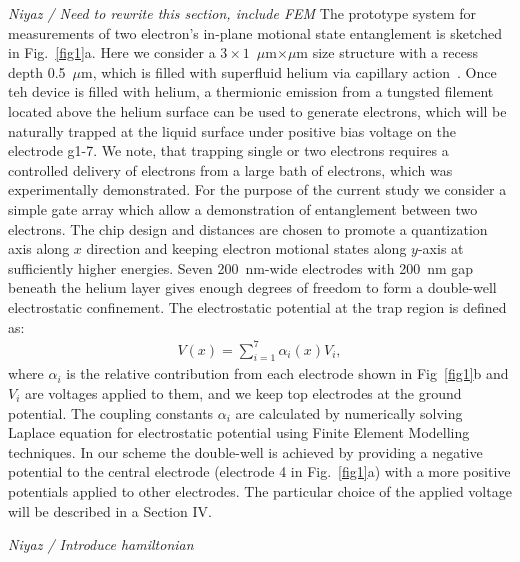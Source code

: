 \documentclass[twocolumn,superscriptaddress,unsortedaddress,
 amsmath,amssymb,
 aps,
]{revtex4-2}
\begin{document}
\textit{Niyaz / Need to rewrite this section, include FEM} The prototype system for measurements of two electron's in-plane motional state entanglement is sketched in Fig.~\ref{fig1}a. Here we consider a $3 \times 1$~$\mu$m$\times\mu$m size structure with a recess depth 0.5~$\mu$m, which is filled with superfluid helium via capillary action~\cite{marty1986stability}. Once teh device is filled with helium, a thermionic emission from a tungsted filement located above the helium surface can be used to generate electrons, which will be naturally trapped at the liquid surface under positive bias voltage on the electrode g1-7. We note, that trapping single or two electrons requires a controlled delivery of electrons from a large bath of electrons, which was experimentally demonstrated. For the purpose of the current study we consider a simple gate array which allow a demonstration of entanglement between two electrons. The chip design and distances are chosen to promote a quantization axis along $x$ direction and keeping electron motional states along $y$-axis at sufficiently higher energies. Seven 200~nm-wide electrodes with 200~nm gap beneath the helium layer gives enough degrees of freedom to form a double-well electrostatic confinement. The electrostatic potential at the trap region is defined as:
\begin{align}
            V(x) = \sum_{i=1}^7 \alpha_i(x) V_i,
            \label{eq:trap}
\end{align}
where $\alpha_i$ is the relative contribution from each electrode shown in Fig~\ref{fig1}b and $V_i$ are voltages applied to them, and we keep top electrodes at the ground potential. The coupling constants $\alpha_i$ are calculated by numerically solving Laplace equation for electrostatic potential using Finite Element Modelling techniques. In our scheme the double-well is achieved by providing a negative potential to the central electrode (electrode 4 in Fig.~\ref{fig1}a) with a more positive potentials applied to other electrodes. The particular choice of the applied voltage will be described in a Section IV.

\textit{Niyaz / Introduce hamiltonian}
\end{document}

